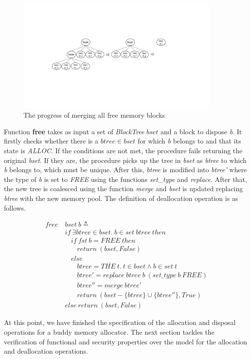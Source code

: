 \begin{figure}[htbp]
	\centering
	\includegraphics[width=0.9\textwidth]{fig2.pdf}
	\caption{The progress of merging all free memory blocks}
	\label{fig:merginfreeblocks}
\end{figure}

Function \textbf{free} takes as input a set of \emph{BlockTree} $bset$ and a block to dispose \emph{b}. It firstly checks whether there is a $btree \in bset$ for which \emph{b} belongs to and that its state is \emph{ALLOC}. If the conditions are not met, the procedure fails returning the original \emph{bset}. If they are, the procedure picks up the  tree in \emph{bset} as \emph{btree} to which \emph{b} belongs to, which must be unique. After this, \emph{btree} is modified into \emph{btree'} where the type of \emph{b} is set to \emph{FREE} using the functions \emph{set\_type} and \emph{replace}. After that, the new tree is coalesced using the function \emph{merge} and \emph{bset} is updated replacing \emph{btree} with the new memory pool. The definition of deallocation operation is as follows.

\begin{definition} 
\end{definition}
\vspace{-7pt}
{\footnotesize
\begin{align*}
free\ &bset\ b \triangleq \\
&if\ \exists btree \in bset.\ b \in set\ btree\ then \\
&\ \ \ \ if\ fst\ b = FREE\ then \\
&\ \ \ \ \ \ \ \ return\ (bset, False) \\
&\ \ \ \ else \\
&\ \ \ \ \ \ \ \ btree = THE\ t.\ t \in bset \wedge b \in set\ t \\
&\ \ \ \ \ \ \ \ btree' = replace\ btree\ b\ (set\_type\ b\ FREE) \\
&\ \ \ \ \ \ \ \ btree'' = merge\ btree' \\
&\ \ \ \ \ \ \ \ return\ (bset - \lbrace btree \rbrace \cup \lbrace btree'' \rbrace, True) \\
&else\ return\ (bset, False)
\end{align*}
}
\vspace{-12pt}

At this point, we have finished the specification of the allocation and disposal operations for a buddy memory allocator. The next section tackles the verification of functional and security properties over the model for the allocation and deallocation operations.
